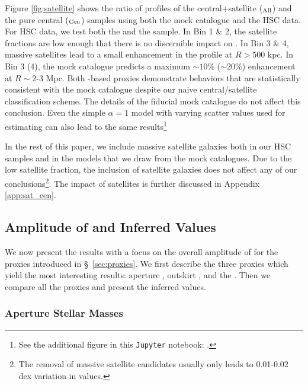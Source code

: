 \documentclass[fleqn,usenatbib,useAMS]{mnras}
\begin{document}
\begin{CJK*}{UTF8}{gbsn}
    Figure \ref{fig:satellite} shows the ratio of \dsigma{} profiles of the central$+$satellite 
    (\dsigma{}$_{\rm All}$) and the pure central (\dsigma{}$_{\rm Cen}$) samples using both 
    the mock catalogue and the HSC data.
    For HSC data, we test both the  and the  sample. 
    In Bin 1 \& 2, the satellite fractions are low enough that there is no discernible impact on
    \dsigma{}.
    In Bin 3 \& 4, massive satellites lead to a small enhancement in the \dsigma{} profile at $R >
    500$ kpc.
    In Bin 3 (4), the mock catalogue predicts a maximum $\sim 10$\% ($\sim 20$\%) enhancement at $R
    \sim 2$-3 Mpc.
    Both \mstar{}-based proxies demonstrate behaviors that are statistically consistent with the
    mock catalogue despite our naive central/satellite classification scheme.
    The details of the fiducial mock catalogue do not affect this conclusion. 
    Even the simple $\alpha=1$ model with varying scatter values used for estimating
    \scatterMhaloObsSym{} can also lead to the same results\footnote{See the additional figure in
    this \texttt{Jupyter} notebook: 
    \href{https://github.com/dr-guangtou/jianbing/blob/master/notebooks/figure/fig4.ipynb}{\faGithub}.}

    In the rest of this paper, we include massive satellite galaxies both in our HSC samples and in
    the models that we draw from the mock catalogues. 
    Due to the low satellite fraction, the inclusion of satellite galaxies does not affect any 
    of our conclusions\footnote{The removal of massive satellite candidates usually only leads to
    0.01-0.02 dex variation in \scatterMhaloObsSym{} values.}.
    The impact of satellites is further discussed in Appendix \ref{app:sat_cen}.
    
\subsection{Amplitude of \texorpdfstring{\dsigma{}}{DSigma} and Inferred \texorpdfstring{\sigmvir{}}{SigMvir} Values}
    \label{sec:topn_results}

    We now present the \topn{} results with a focus on the overall amplitude of \dsigma{} for the
    \mvir{} proxies introduced in \S\ \ref{sec:proxies}. 
    We first describe the three proxies which yield the most interesting results: 
    aperture \mstar{}, outskirt \mstar{}, and the \mcmodel{}. 
    Then we compare all the \mvir{} proxies and present the inferred \sigmvir{} values.

\subsubsection{Aperture Stellar Masses}
    \label{sec:m_aper}


\end{CJK*}
\end{document}
